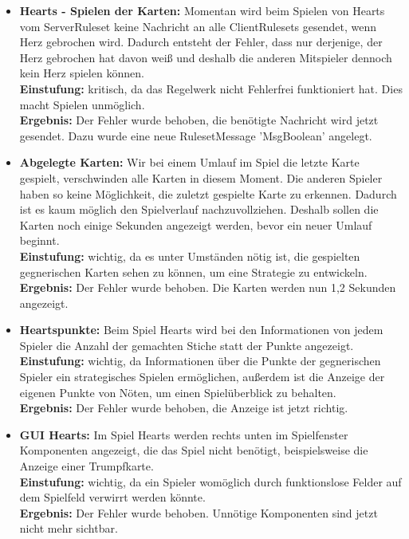 \documentclass[a4paper]{article}
\begin{document}
	\begin{itemize}
	\item \textbf{Hearts - Spielen der Karten:} Momentan wird beim Spielen von Hearts vom ServerRuleset keine Nachricht an 		alle ClientRulesets gesendet, wenn Herz gebrochen wird. Dadurch entsteht der Fehler, dass nur derjenige, der Herz 			gebrochen hat davon weiß und deshalb die anderen Mitspieler dennoch kein Herz spielen können. \\
	\textbf{Einstufung:} kritisch, da das Regelwerk nicht Fehlerfrei funktioniert hat. Dies macht Spielen unmöglich.\\
	\textbf{Ergebnis:} Der Fehler wurde behoben, die benötigte Nachricht wird jetzt gesendet. Dazu wurde eine neue RulesetMessage 'MsgBoolean' angelegt.\\
	
	\item \textbf{Abgelegte Karten:} Wir bei einem Umlauf im Spiel die letzte Karte gespielt, verschwinden alle Karten in 			diesem Moment. Die anderen Spieler haben so keine Möglichkeit, die zuletzt gespielte Karte zu erkennen. Dadurch ist es 			kaum möglich den Spielverlauf nachzuvollziehen. Deshalb sollen die Karten noch einige Sekunden angezeigt werden, bevor 		ein neuer Umlauf beginnt. \\
	\textbf{Einstufung:} wichtig, da es unter Umständen nötig ist, die gespielten gegnerischen Karten sehen zu können, um eine Strategie zu entwickeln. 
	\textbf{Ergebnis:} Der Fehler wurde behoben. Die Karten werden nun 1,2 Sekunden angezeigt.\\
	
	\item \textbf{Heartspunkte:} Beim Spiel Hearts wird bei den Informationen von jedem Spieler die Anzahl der gemachten 			Stiche statt der Punkte angezeigt. \\
	\textbf{Einstufung:} wichtig, da Informationen über die Punkte der gegnerischen Spieler ein strategisches Spielen ermöglichen, außerdem ist die Anzeige der eigenen Punkte von Nöten, um einen Spielüberblick zu behalten.\\
	\textbf{Ergebnis:} Der Fehler wurde behoben, die Anzeige ist jetzt richtig.

	\item \textbf{GUI Hearts:} Im Spiel Hearts werden rechts unten im Spielfenster Komponenten angezeigt, die das Spiel 			nicht benötigt, beispielsweise die Anzeige einer Trumpfkarte. \\
	\textbf{Einstufung:} wichtig, da ein Spieler womöglich durch funktionslose Felder auf dem Spielfeld verwirrt werden könnte.\\
	\textbf{Ergebnis:} Der Fehler wurde behoben. Unnötige Komponenten sind jetzt nicht mehr sichtbar.\\
	

\end{itemize}
\end{document}
